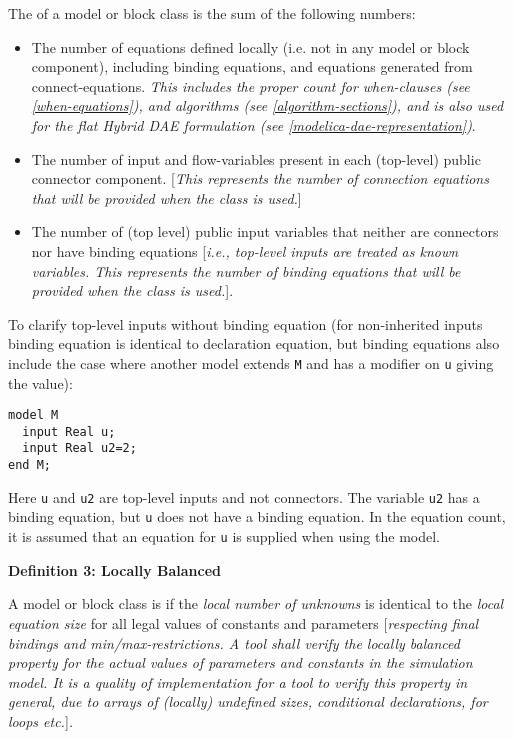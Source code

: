 The  of a model or block class is the sum of the
following numbers:
\begin{itemize}
\item
  The number of equations defined locally (i.e. not in any model or
  block component), including binding equations, and equations generated
  from connect-equations. \emph{This includes the proper count for
  when-clauses (see \autoref{when-equations}), and algorithms (see \autoref{algorithm-sections}),
  and is also used for the flat Hybrid DAE formulation
  (see \autoref{modelica-dae-representation})}.
\item
  The number of input and flow-variables present in each (top-level)
  public connector component. {[}\emph{This represents the number of
  connection equations that will be provided when the class is used.}{]}
\item
  The number of (top level) public input variables that neither are
  connectors nor have binding equations {[}\emph{i.e., top-level inputs
  are treated as known variables. This represents the number of binding
  equations that will be provided when the class is used.}{]}.
\end{itemize}

\begin{nonnormative}
To clarify top-level inputs without binding equation (for
non-inherited inputs binding equation is identical to declaration
equation, but binding equations also include the case where another
model extends \lstinline!M! and has a modifier on \lstinline!u! giving the value):
\begin{lstlisting}[language=modelica]
model M
  input Real u;
  input Real u2=2;
end M;
\end{lstlisting}

Here \lstinline!u! and \lstinline!u2! are top-level inputs and not connectors. The
variable \lstinline!u2! has a binding equation, but \lstinline!u! does not have a binding
equation. In the equation count, it is assumed that an equation for \lstinline!u! is
supplied when using the model.
\end{nonnormative}

\textbf{Definition 3: Locally Balanced}

A model or block class is  if the
\emph{local number of unknowns} is identical to the \emph{local equation size} for all legal
values of constants and parameters {[}\emph{respecting final bindings
and min/max-restrictions. A tool shall verify the \emph{locally balanced}
property for the actual values of parameters and constants in the
simulation model. It is a quality of implementation for a tool to verify
this property in general, due to arrays of (locally) undefined sizes,
conditional declarations, for loops etc.}{]}\emph{.}

